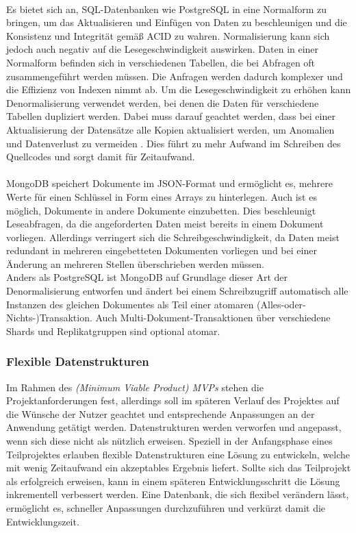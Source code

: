 \paragraph{}
Es bietet sich an, SQL-Datenbanken wie PostgreSQL in eine Normalform zu bringen, um das Aktualisieren und Einfügen von Daten zu beschleunigen und die Konsistenz und Integrität gemäß ACID zu wahren.
Normalisierung kann sich jedoch auch negativ auf die Lesegeschwindigkeit auswirken.
Daten in einer Normalform befinden sich in verschiedenen Tabellen, die bei Abfragen oft zusammengeführt werden müssen.
Die Anfragen werden dadurch komplexer und die Effizienz von Indexen nimmt ab.
Um die Lesegeschwindigkeit zu erhöhen kann Denormalisierung verwendet werden, bei denen die Daten für verschiedene Tabellen dupliziert werden.
Dabei muss darauf geachtet werden, dass bei einer Aktualisierung der Datensätze alle Kopien aktualisiert werden, um Anomalien und Datenverlust zu vermeiden \cite{db:denormalization}.
Dies führt zu mehr Aufwand im Schreiben des Quellcodes und sorgt damit für Zeitaufwand.


\paragraph{}
MongoDB speichert Dokumente im JSON-Format und ermöglicht es, mehrere Werte für einen Schlüssel in Form eines Arrays zu hinterlegen.
Auch ist es möglich, Dokumente in andere Dokumente einzubetten. \cite{db:mongoEmbeddedDocuments}
Dies beschleunigt Leseabfragen, da die angeforderten Daten meist bereits in einem Dokument vorliegen.
Allerdings verringert sich die Schreibgeschwindigkeit, da Daten meist redundant in mehreren eingebetteten Dokumenten vorliegen und bei einer Änderung an mehreren Stellen überschrieben werden müssen.\\
Anders als PostgreSQL ist MongoDB auf Grundlage dieser Art der Denormalisierung entworfen und ändert bei einem Schreibzugriff automatisch alle Instanzen des gleichen Dokumentes als Teil einer atomaren (Alles-oder-Nichts-)Transaktion.
Auch Multi-Dokument-Transaktionen über verschiedene Shards und Replikatgruppen sind optional atomar. \cite{db:mongoAcidCompliance}

\subsubsection{Flexible Datenstrukturen}
Im Rahmen des \textit{(Minimum Viable Product) MVPs} stehen die Projektanforderungen fest, allerdings soll im späteren Verlauf des Projektes auf die Wünsche der Nutzer geachtet und entsprechende Anpassungen an der Anwendung getätigt werden.
Datenstrukturen werden verworfen und angepasst, wenn sich diese nicht als nützlich erweisen.
Speziell in der Anfangsphase eines Teilprojektes erlauben flexible Datenstrukturen eine Lösung zu entwickeln, welche mit wenig Zeitaufwand ein akzeptables Ergebnis liefert.
Sollte sich das Teilprojekt als erfolgreich erweisen, kann in einem späteren Entwicklungsschritt die Lösung inkrementell verbessert werden.
Eine Datenbank, die sich flexibel verändern lässt, ermöglicht es, schneller Anpassungen durchzuführen und verkürzt damit die Entwicklungszeit.

